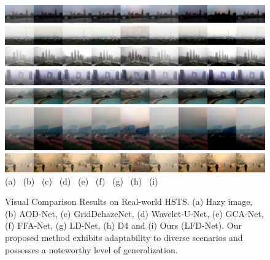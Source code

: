 \documentclass[lettersize,journal]{IEEEtran}
\begin{document}
\begin{figure}[pht]
    \centering
    \includegraphics[width=\textwidth]{hsts_2.jpg}
    \includegraphics[width=\textwidth]{hsts_3.jpg}
    \includegraphics[width=\textwidth]{hsts_4.jpg}
    \includegraphics[width=\textwidth]{hsts_6.jpg}
    \includegraphics[width=\textwidth]{hsts_7.jpg}
    \includegraphics[width=\textwidth]{hsts_8.jpg}
    \includegraphics[width=\textwidth]{hsts_9.jpg}
    (a) \qquad\quad\;\;\;\ (b) \qquad\quad\;\;\;\ (c) \qquad\quad\;\;\;\ (d) \qquad\quad\;\;\;\, (e) \qquad\quad\;\;\;\, (f) \qquad\quad\;\;\;\ (g) \qquad\quad\;\;\;\ (h) \qquad\quad\;\;\;\ (i)
    \caption{Visual Comparison Results on Real-world HSTS. (a) Hazy image, (b) AOD-Net\cite{li2017aod}, (c) GridDehazeNet\cite{liu2019griddehazenet}, (d) Wavelet-U-Net\cite{yang2019wavelet}, (e) GCA-Net\cite{chen2019gated}, (f) FFA-Net\cite{qin2020ffa}, (g) LD-Net\cite{ullah2021light}, (h) D4\cite{yang2022d4} and (i) Ours (LFD-Net). Our proposed method exhibits adaptability to diverse scenarios and possesses a noteworthy level of generalization.}
    \label{hsts}
\end{figure}
\end{document}
